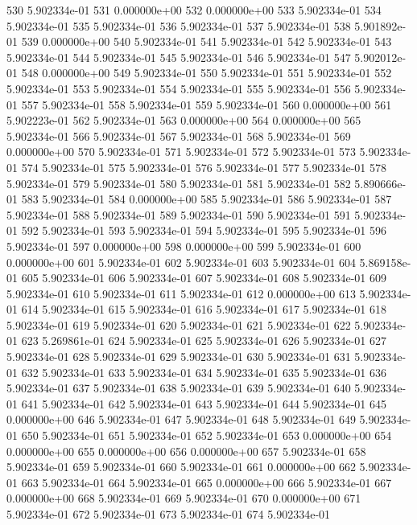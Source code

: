 \documentclass{article}
\begin{document}
\begin{Schunk}
\begin{Soutput}
530  5.902334e-01
531  0.000000e+00
532  0.000000e+00
533  5.902334e-01
534  5.902334e-01
535  5.902334e-01
536  5.902334e-01
537  5.902334e-01
538  5.901892e-01
539  0.000000e+00
540  5.902334e-01
541  5.902334e-01
542  5.902334e-01
543  5.902334e-01
544  5.902334e-01
545  5.902334e-01
546  5.902334e-01
547  5.902012e-01
548  0.000000e+00
549  5.902334e-01
550  5.902334e-01
551  5.902334e-01
552  5.902334e-01
553  5.902334e-01
554  5.902334e-01
555  5.902334e-01
556  5.902334e-01
557  5.902334e-01
558  5.902334e-01
559  5.902334e-01
560  0.000000e+00
561  5.902223e-01
562  5.902334e-01
563  0.000000e+00
564  0.000000e+00
565  5.902334e-01
566  5.902334e-01
567  5.902334e-01
568  5.902334e-01
569  0.000000e+00
570  5.902334e-01
571  5.902334e-01
572  5.902334e-01
573  5.902334e-01
574  5.902334e-01
575  5.902334e-01
576  5.902334e-01
577  5.902334e-01
578  5.902334e-01
579  5.902334e-01
580  5.902334e-01
581  5.902334e-01
582  5.890666e-01
583  5.902334e-01
584  0.000000e+00
585  5.902334e-01
586  5.902334e-01
587  5.902334e-01
588  5.902334e-01
589  5.902334e-01
590  5.902334e-01
591  5.902334e-01
592  5.902334e-01
593  5.902334e-01
594  5.902334e-01
595  5.902334e-01
596  5.902334e-01
597  0.000000e+00
598  0.000000e+00
599  5.902334e-01
600  0.000000e+00
601  5.902334e-01
602  5.902334e-01
603  5.902334e-01
604  5.869158e-01
605  5.902334e-01
606  5.902334e-01
607  5.902334e-01
608  5.902334e-01
609  5.902334e-01
610  5.902334e-01
611  5.902334e-01
612  0.000000e+00
613  5.902334e-01
614  5.902334e-01
615  5.902334e-01
616  5.902334e-01
617  5.902334e-01
618  5.902334e-01
619  5.902334e-01
620  5.902334e-01
621  5.902334e-01
622  5.902334e-01
623  5.269861e-01
624  5.902334e-01
625  5.902334e-01
626  5.902334e-01
627  5.902334e-01
628  5.902334e-01
629  5.902334e-01
630  5.902334e-01
631  5.902334e-01
632  5.902334e-01
633  5.902334e-01
634  5.902334e-01
635  5.902334e-01
636  5.902334e-01
637  5.902334e-01
638  5.902334e-01
639  5.902334e-01
640  5.902334e-01
641  5.902334e-01
642  5.902334e-01
643  5.902334e-01
644  5.902334e-01
645  0.000000e+00
646  5.902334e-01
647  5.902334e-01
648  5.902334e-01
649  5.902334e-01
650  5.902334e-01
651  5.902334e-01
652  5.902334e-01
653  0.000000e+00
654  0.000000e+00
655  0.000000e+00
656  0.000000e+00
657  5.902334e-01
658  5.902334e-01
659  5.902334e-01
660  5.902334e-01
661  0.000000e+00
662  5.902334e-01
663  5.902334e-01
664  5.902334e-01
665  0.000000e+00
666  5.902334e-01
667  0.000000e+00
668  5.902334e-01
669  5.902334e-01
670  0.000000e+00
671  5.902334e-01
672  5.902334e-01
673  5.902334e-01
674  5.902334e-01

\end{Soutput}
\end{Schunk}
\end{document}
